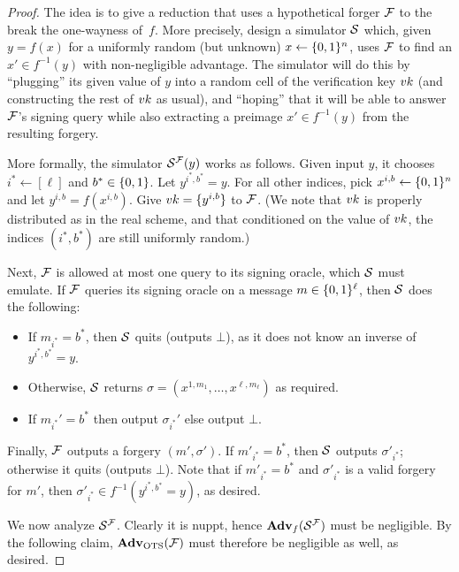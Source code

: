 \documentclass[11pt]{article}
\begin{document}
\begin{proof}
  The idea is to give a reduction that uses a hypothetical forger
  $\mathcal{F}$ to the break the one-wayness of~$f$.  More precisely, design
  a simulator $\mathcal{S}$ which, given $y = f(x)$ for a uniformly random
  (but unknown) $x \gets \{0,1\}^{n}$, uses $\mathcal{F}$ to find an $x' \in
  f^{-1}(y)$ with non-negligible advantage.  The simulator will do
  this by ``plugging'' its given value of $y$ into a random cell of
  the verification key $vk$ (and constructing the rest of $vk$ as
  usual), and ``hoping'' that it will be able to answer $\mathcal{F}$'s
  signing query while also extracting a preimage $x' \in f^{-1}(y)$
  from the resulting forgery.

  More formally, the simulator $\mathcal{S}^{\mathcal{F}}(y)$ works as follows.
  Given input $y$, it chooses $i^* \gets [\ell]$ and $b^* \in \{0,1\}$.
  Let $y^{i^*,b^*} = y$.  For all other indices, pick $x^{i,b} \gets
  \{0,1\}^n$ and let $y^{i,b} = f(x^{i,b})$.  Give $vk = \{y^{i,b}\}$
  to $\mathcal{F}$.  (We note that $vk$ is properly distributed as in the
  real scheme, and that conditioned on the value of $vk$, the indices
  $(i^*,b^*)$ are still uniformly random.)

  Next, $\mathcal{F}$ is allowed at most one query to its signing oracle,
  which $\mathcal{S}$ must emulate.  If $\mathcal{F}$ queries its signing oracle on
  a message $m \in \{0,1\}^{\ell}$, then $\mathcal{S}$ does the following:
  \begin{itemize}
  \item If $m_{i^*} = b^*$, then $\mathcal{S}$ quits (outputs $\bot$), as it
    does not know an inverse of $y^{i^{*},b^{*}} = y$.
  \item Otherwise, $\mathcal{S}$ returns $\sigma = (x^{1,m_{1}}, \ldots,
    x^{\ell,m_{\ell}})$ as required.
  \item If $m_{i^*}' = b^*$ then output $\sigma_{i^*}'$ else output
    $\bot$.
  \end{itemize}

  Finally, $\mathcal{F}$ outputs a forgery $(m', \sigma')$.  If $m'_{i^{*}} =
  b^{*}$, then $\mathcal{S}$ outputs $\sigma'_{i^{*}}$; otherwise it quits
  (outputs $\bot$).  Note that if $m'_{i^{*}} = b^{*}$ and
  $\sigma'_{i^*}$ is a valid forgery for $m'$, then $\sigma'_{i^{*}}
  \in f^{-1}(y^{i^*,b^*} = y)$, as desired.

  We now analyze $\mathcal{S}^{\mathcal{F}}$.  Clearly it is nuppt, hence
  $\mathbf{Adv}_{f}(\mathcal{S}^{\mathcal{F}})$ must be negligible.  By the following
  claim, $\mathbf{Adv}_{\text{OTS}}(\mathcal{F})$ must therefore be negligible as well,
  as desired.


\end{proof}
\end{document}
